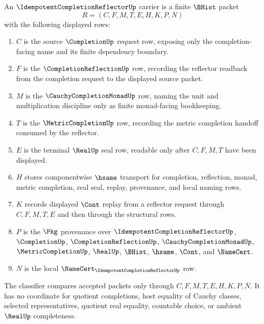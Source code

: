 \begin{definition}
\label{def:idempotent-completion-reflector-carrier}
An $\IdempotentCompletionReflectorUp$ carrier is a finite $\BHist$ packet
$$
R=(C,F,M,T,E,H,K,P,N)
$$
with the following displayed rows:
\begin{enumerate}
\item $C$ is the source $\CompletionUp$ request row, exposing only the completion-facing name and its finite dependency boundary.
\item $F$ is the $\CompletionReflectionUp$ row, recording the reflector readback from the completion request to the displayed source packet.
\item $M$ is the $\CauchyCompletionMonadUp$ row, naming the unit and multiplication discipline only as finite monad-facing bookkeeping.
\item $T$ is the $\MetricCompletionUp$ row, recording the metric completion handoff consumed by the reflector.
\item $E$ is the terminal $\RealUp$ seal row, readable only after $C,F,M,T$ have been displayed.
\item $H$ stores componentwise $\hsame$ transport for completion, reflection, monad, metric completion, real seal, replay, provenance, and local naming rows.
\item $K$ records displayed $\Cont$ replay from a reflector request through $C,F,M,T,E$ and then through the structural rows.
\item $P$ is the $\Pkg$ provenance over $\IdempotentCompletionReflectorUp$, $\CompletionUp$, $\CompletionReflectionUp$, $\CauchyCompletionMonadUp$, $\MetricCompletionUp$, $\RealUp$, $\BHist$, $\hsame$, $\Cont$, and $\NameCert$.
\item $N$ is the local $\NameCert_{\IdempotentCompletionReflectorUp}$ row.
\end{enumerate}
The classifier compares accepted packets only through $C,F,M,T,E,H,K,P,N$. It has no coordinate for quotient completions, host equality of Cauchy classes, selected representatives, quotient real equality, countable choice, or ambient $\RealUp$ completeness.
\end{definition}

